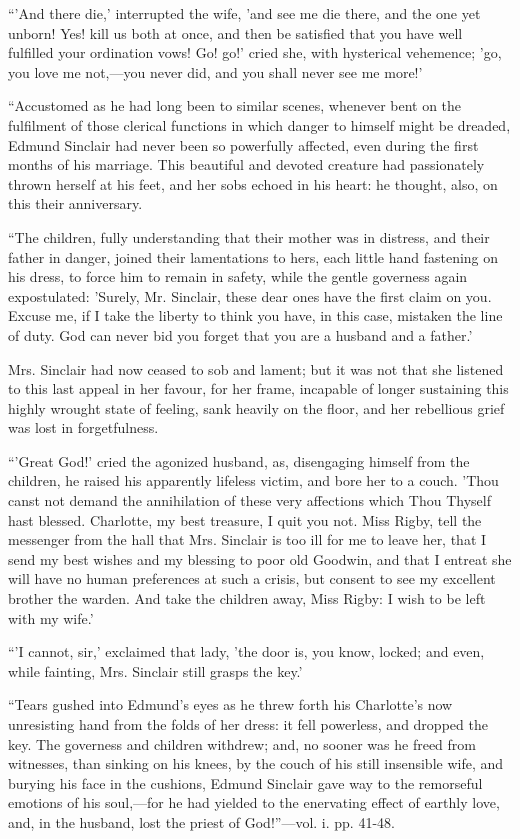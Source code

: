 ``'And there die,' interrupted the
wife, 'and see me die there, and the one yet unborn! Yes! kill us both
at once, and then be satisfied that you have well fulfilled your
ordination vows! Go! go!' cried she, with hysterical vehemence; 'go, you
love me not,—you never did, and you shall never see me more!'

``Accustomed as he had long been to
similar scenes, whenever bent on the fulfilment of those clerical
functions in which danger to himself might be dreaded, Edmund Sinclair
had never been so powerfully affected, even during the first months of
his marriage. This beautiful and devoted creature had passionately
thrown herself at his feet, and her sobs echoed in his heart: he
thought, also, on this their anniversary.

``The children, fully
understanding that their mother was in distress, and their father in
danger, joined their lamentations to hers, each little hand fastening on
his dress, to force him to remain in safety, while the gentle governess
again expostulated: 'Surely, Mr. Sinclair, these dear ones have the
first claim on you. Excuse me, if I take the liberty to think you have,
in this case, mistaken the line of duty. God can never bid you forget
that you are a husband and a father.'

Mrs. Sinclair had now ceased to sob
and lament; but it was not that she listened to this last appeal in her
favour, for her frame, incapable of longer sustaining this highly
wrought state of feeling, sank heavily on the floor, and her rebellious
grief was lost in forgetfulness.

``'Great God!' cried the agonized
husband, as, disengaging himself from the children, he raised his
apparently lifeless victim, and bore her to a couch. 'Thou canst not
demand the annihilation of these very affections which Thou Thyself hast
blessed. Charlotte, my best treasure, I quit you not. Miss Rigby, tell
the messenger from the hall that Mrs. Sinclair is too ill for me to
leave her, that I send my best wishes and my blessing to poor old
Goodwin, and that I entreat she will have no human preferences at such a
crisis, but consent to see my excellent brother the warden. And take the
children away, Miss Rigby: I wish to be left with my wife.'

``'I cannot, sir,' exclaimed that
lady, 'the door is, you know, locked; and even, while fainting, Mrs.
Sinclair still grasps the key.'

``Tears gushed into Edmund's eyes as
he threw forth his Charlotte's now unresisting hand from the folds of
her dress: it fell powerless, and dropped the key. The governess and
children withdrew; and, no sooner was he freed from witnesses, than
sinking on his knees, by the couch of his still insensible wife, and
burying his face in the cushions, Edmund Sinclair gave way to the
remorseful emotions of his soul,—for he had yielded to the enervating
effect of earthly love, and, in the husband, lost the priest of God!''—vol.
i. pp. 41-48.

